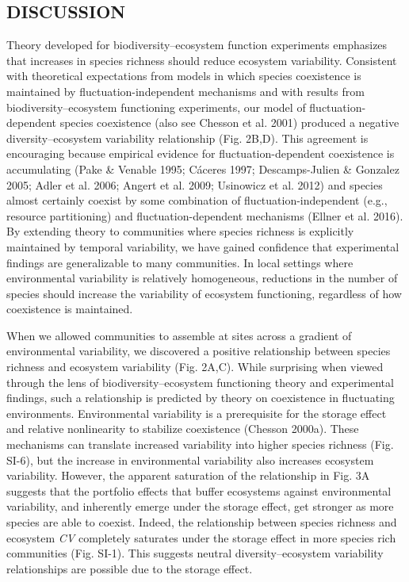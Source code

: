 \documentclass[12pt,]{article}
\begin{document}
\subsection{DISCUSSION}\label{discussion}

Theory developed for biodiversity--ecosystem function experiments
emphasizes that increases in species richness should reduce ecosystem
variability. Consistent with theoretical expectations from models in
which species coexistence is maintained by fluctuation-independent
mechanisms and with results from biodiversity--ecosystem functioning
experiments, our model of fluctuation-dependent species coexistence
(also see Chesson et al. 2001) produced a negative diversity--ecosystem
variability relationship (Fig. 2B,D). This agreement is encouraging
because empirical evidence for fluctuation-dependent coexistence is
accumulating (Pake \& Venable 1995; Cáceres 1997; Descamps-Julien \&
Gonzalez 2005; Adler et al. 2006; Angert et al. 2009; Usinowicz et al.
2012) and species almost certainly coexist by some combination of
fluctuation-independent (e.g., resource partitioning) and
fluctuation-dependent mechanisms (Ellner et al. 2016). By extending
theory to communities where species richness is explicitly maintained by
temporal variability, we have gained confidence that experimental
findings are generalizable to many communities. In local settings where
environmental variability is relatively homogeneous, reductions in the
number of species should increase the variability of ecosystem
functioning, regardless of how coexistence is maintained.

When we allowed communities to assemble at sites across a gradient of
environmental variability, we discovered a positive relationship between
species richness and ecosystem variability (Fig. 2A,C). While surprising
when viewed through the lens of biodiversity--ecosystem functioning
theory and experimental findings, such a relationship is predicted by
theory on coexistence in fluctuating environments. Environmental
variability is a prerequisite for the storage effect and relative
nonlinearity to stabilize coexistence (Chesson 2000a). These mechanisms
can translate increased variability into higher species richness (Fig.
SI-6), but the increase in environmental variability also increases
ecosystem variability. However, the apparent saturation of the
relationship in Fig. 3A suggests that the portfolio effects that buffer
ecosystems against environmental variability, and inherently emerge
under the storage effect, get stronger as more species are able to
coexist. Indeed, the relationship between species richness and ecosystem
\emph{CV} completely saturates under the storage effect in more species
rich communities (Fig. SI-1). This suggests neutral diversity--ecosystem
variability relationships are possible due to the storage effect.
\end{document}
